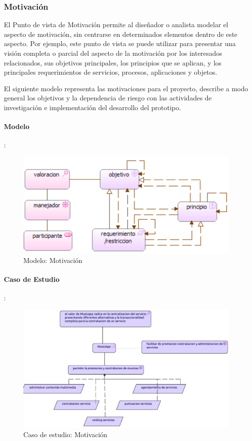 \newpage

\subsubsection{Motivación}
El Punto de vista de Motivación permite al diseñador o analista modelar el aspecto de motivación, sin centrarse en determinados elementos dentro de este aspecto. Por ejemplo, este punto de vista se puede utilizar para presentar una visión completa o parcial del aspecto de la motivación por los interesados relacionados, sus objetivos principales, los principios que se aplican, y los principales requerimientos de servicios, procesos, aplicaciones y objetos.  \vspace{\baselineskip}

El siguiente modelo representa las motivaciones para el proyecto, describe a modo general los objetivos y la dependencia de riesgo con las actividades de investigación e implementación del desarrollo del prototipo.

\paragraph{Modelo}:
\begin{figure}[h!]
	\centering
	\includegraphics[width=0.8\linewidth]{Desarrollo/ArquitecturaEmpresarial/Motivacion/imgs/MotivacionMetamodelo.PNG}
	\caption{Modelo:  Motivación}
\end{figure}
\newpage
\paragraph{Caso de Estudio}:
\begin{figure}[h!]
	\centering
	\includegraphics[width=\linewidth]{Desarrollo/ArquitecturaEmpresarial/Motivacion/imgs/Motivacion.pdf}
	\caption{Caso de estudio: Motivación}
	\label{fig:comportamiento}
\end{figure}

\newpage

